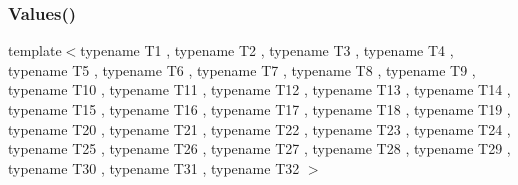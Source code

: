 \mbox{\label{namespacetesting_afeff614d4c808c753bbfa208409ad664}} 
\subsubsection{\texorpdfstring{Values()}{Values()}\hspace{0.1cm}{\footnotesize\ttfamily [33/51]}}
{\footnotesize\ttfamily template$<$typename T1 , typename T2 , typename T3 , typename T4 , typename T5 , typename T6 , typename T7 , typename T8 , typename T9 , typename T10 , typename T11 , typename T12 , typename T13 , typename T14 , typename T15 , typename T16 , typename T17 , typename T18 , typename T19 , typename T20 , typename T21 , typename T22 , typename T23 , typename T24 , typename T25 , typename T26 , typename T27 , typename T28 , typename T29 , typename T30 , typename T31 , typename T32 $>$ \\
}
